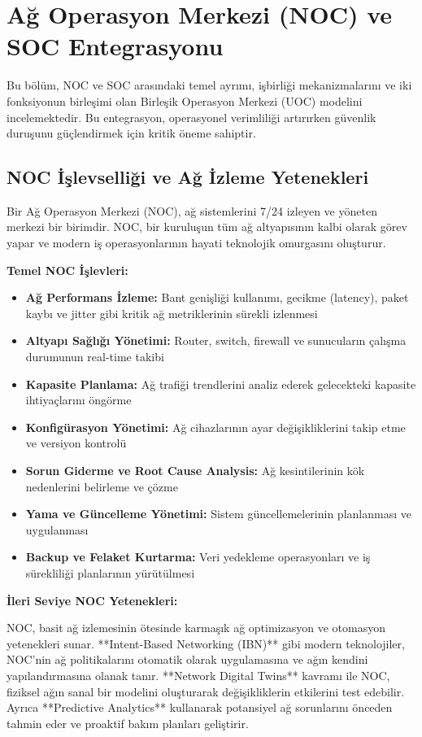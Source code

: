 \section{Ağ Operasyon Merkezi (NOC) ve SOC Entegrasyonu}

Bu bölüm, NOC ve SOC arasındaki temel ayrımı, işbirliği mekanizmalarını ve iki fonksiyonun birleşimi olan Birleşik Operasyon Merkezi (UOC) modelini incelemektedir. Bu entegrasyon, operasyonel verimliliği artırırken güvenlik duruşunu güçlendirmek için kritik öneme sahiptir.

\subsection{NOC İşlevselliği ve Ağ İzleme Yetenekleri}

Bir Ağ Operasyon Merkezi (NOC), ağ sistemlerini 7/24 izleyen ve yöneten merkezi bir birimdir. NOC, bir kuruluşun tüm ağ altyapısının kalbi olarak görev yapar ve modern iş operasyonlarının hayati teknolojik omurgasını oluşturur.

\textbf{Temel NOC İşlevleri:}
\begin{itemize}
    \item \textbf{Ağ Performans İzleme:} Bant genişliği kullanımı, gecikme (latency), paket kaybı ve jitter gibi kritik ağ metriklerinin sürekli izlenmesi
    \item \textbf{Altyapı Sağlığı Yönetimi:} Router, switch, firewall ve sunucuların çalışma durumunun real-time takibi
    \item \textbf{Kapasite Planlama:} Ağ trafiği trendlerini analiz ederek gelecekteki kapasite ihtiyaçlarını öngörme
    \item \textbf{Konfigürasyon Yönetimi:} Ağ cihazlarının ayar değişikliklerini takip etme ve versiyon kontrolü
    \item \textbf{Sorun Giderme ve Root Cause Analysis:} Ağ kesintilerinin kök nedenlerini belirleme ve çözme
    \item \textbf{Yama ve Güncelleme Yönetimi:} Sistem güncellemelerinin planlanması ve uygulanması
    \item \textbf{Backup ve Felaket Kurtarma:} Veri yedekleme operasyonları ve iş sürekliliği planlarının yürütülmesi
\end{itemize}

\textbf{İleri Seviye NOC Yetenekleri:}

NOC, basit ağ izlemesinin ötesinde karmaşık ağ optimizasyon ve otomasyon yetenekleri sunar. **Intent-Based Networking (IBN)** gibi modern teknolojiler, NOC'nin ağ politikalarını otomatik olarak uygulamasına ve ağın kendini yapılandırmasına olanak tanır. **Network Digital Twins** kavramı ile NOC, fiziksel ağın sanal bir modelini oluşturarak değişikliklerin etkilerini test edebilir. Ayrıca **Predictive Analytics** kullanarak potansiyel ağ sorunlarını önceden tahmin eder ve proaktif bakım planları geliştirir.

